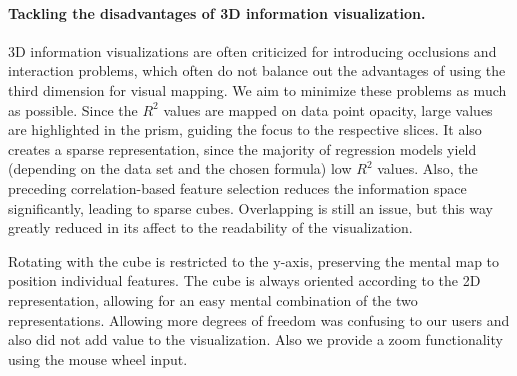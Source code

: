 \documentclass[journal]{style/vgtc} 			          %
\begin{document}
\paragraph{Tackling the disadvantages of 3D information visualization.}
3D information visualizations are often criticized for introducing occlusions and interaction problems, which often do not balance out the advantages of using the third dimension for visual mapping.
We aim to minimize these problems as much as possible.
Since the $R^2$ values are mapped on data point opacity, large values are highlighted in the prism, guiding the focus to the respective slices.
It also creates a sparse representation, since the majority of regression models yield (depending on the data set and the chosen formula) low $R^2$ values.
Also, the preceding correlation-based feature selection reduces the information space significantly, leading to sparse cubes.
Overlapping is still an issue, but this way greatly reduced in its affect to the readability of the visualization.

Rotating with the cube is restricted to the y-axis, preserving the mental map to position individual features.
The cube is always oriented according to the 2D representation, allowing for an easy mental combination of the two representations.
Allowing more degrees of freedom was confusing to our users and also did not add value to the visualization.
Also we provide a zoom functionality using the mouse wheel input.
\end{document}
